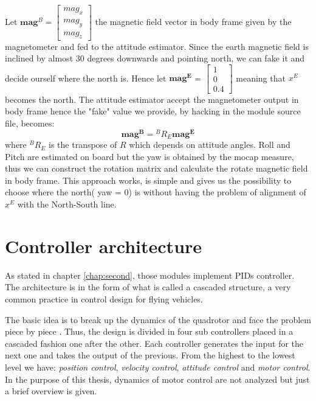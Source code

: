 \noindent
Let $\boldsymbol{mag}^B = \begin{bmatrix}mag_x\\mag_y\\mag_z\end{bmatrix}$ the magnetic field vector in body frame given by the magnetometer and fed to the attitude estimator. Since the earth magnetic field is inclined by almost 30 degrees downwards and pointing north, we can fake it and decide ourself where the north is. Hence let $\boldsymbol{mag^E}$ = $\begin{bmatrix}1\\0\\0.4\end{bmatrix}$ meaning that $x^E$ becomes the north. The attitude estimator accept the magnetometer output in body frame hence the "fake" value we provide, by hacking in the module source file, becomes:
\begin{equation}
	 \boldsymbol{mag^B} = {}^BR_E \boldsymbol{mag^E}
\end{equation}
where  ${}^BR_E$ is the transpose of $R$ which depends on attitude angles. Roll and Pitch are estimated on board but the yaw is obtained by the mocap measure, thus we can construct the rotation matrix and calculate the rotate magnetic field in body frame. This approach works, is simple and gives us the possibility to choose where the north( yaw = 0) is without having the problem of alignment of $x^E$ with the North-South line.

\section{Controller architecture}

As stated in chapter \ref{chap:second}, those modules implement PIDs controller. The architecture is in the form of what is called a cascaded structure, a very common practice in control design for flying vehicles. 

The basic idea is to break up the dynamics of the quadrotor and face the problem piece by piece \cite{Mellinger2012}. Thus, the design is divided in four sub controllers placed in a cascaded fashion one after the other. Each controller generates the input for the next one and takes the output of the previous. From the highest to the lowest level we have:\textit{ position control}, \textit{velocity control}, \textit{attitude control} and\textit{ motor control}. In the purpose of this thesis, dynamics of motor control are not analyzed but just a brief overview is given. 

